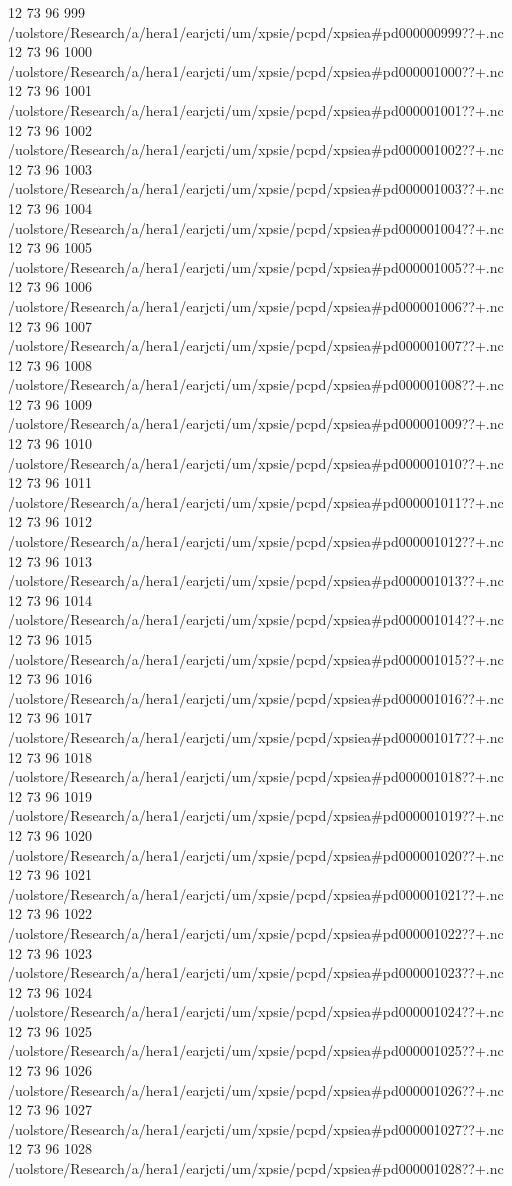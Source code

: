 12 73 96
999
/uolstore/Research/a/hera1/earjcti/um/xpsie/pcpd/xpsiea#pd000000999??+.nc
12 73 96
1000
/uolstore/Research/a/hera1/earjcti/um/xpsie/pcpd/xpsiea#pd000001000??+.nc
12 73 96
1001
/uolstore/Research/a/hera1/earjcti/um/xpsie/pcpd/xpsiea#pd000001001??+.nc
12 73 96
1002
/uolstore/Research/a/hera1/earjcti/um/xpsie/pcpd/xpsiea#pd000001002??+.nc
12 73 96
1003
/uolstore/Research/a/hera1/earjcti/um/xpsie/pcpd/xpsiea#pd000001003??+.nc
12 73 96
1004
/uolstore/Research/a/hera1/earjcti/um/xpsie/pcpd/xpsiea#pd000001004??+.nc
12 73 96
1005
/uolstore/Research/a/hera1/earjcti/um/xpsie/pcpd/xpsiea#pd000001005??+.nc
12 73 96
1006
/uolstore/Research/a/hera1/earjcti/um/xpsie/pcpd/xpsiea#pd000001006??+.nc
12 73 96
1007
/uolstore/Research/a/hera1/earjcti/um/xpsie/pcpd/xpsiea#pd000001007??+.nc
12 73 96
1008
/uolstore/Research/a/hera1/earjcti/um/xpsie/pcpd/xpsiea#pd000001008??+.nc
12 73 96
1009
/uolstore/Research/a/hera1/earjcti/um/xpsie/pcpd/xpsiea#pd000001009??+.nc
12 73 96
1010
/uolstore/Research/a/hera1/earjcti/um/xpsie/pcpd/xpsiea#pd000001010??+.nc
12 73 96
1011
/uolstore/Research/a/hera1/earjcti/um/xpsie/pcpd/xpsiea#pd000001011??+.nc
12 73 96
1012
/uolstore/Research/a/hera1/earjcti/um/xpsie/pcpd/xpsiea#pd000001012??+.nc
12 73 96
1013
/uolstore/Research/a/hera1/earjcti/um/xpsie/pcpd/xpsiea#pd000001013??+.nc
12 73 96
1014
/uolstore/Research/a/hera1/earjcti/um/xpsie/pcpd/xpsiea#pd000001014??+.nc
12 73 96
1015
/uolstore/Research/a/hera1/earjcti/um/xpsie/pcpd/xpsiea#pd000001015??+.nc
12 73 96
1016
/uolstore/Research/a/hera1/earjcti/um/xpsie/pcpd/xpsiea#pd000001016??+.nc
12 73 96
1017
/uolstore/Research/a/hera1/earjcti/um/xpsie/pcpd/xpsiea#pd000001017??+.nc
12 73 96
1018
/uolstore/Research/a/hera1/earjcti/um/xpsie/pcpd/xpsiea#pd000001018??+.nc
12 73 96
1019
/uolstore/Research/a/hera1/earjcti/um/xpsie/pcpd/xpsiea#pd000001019??+.nc
12 73 96
1020
/uolstore/Research/a/hera1/earjcti/um/xpsie/pcpd/xpsiea#pd000001020??+.nc
12 73 96
1021
/uolstore/Research/a/hera1/earjcti/um/xpsie/pcpd/xpsiea#pd000001021??+.nc
12 73 96
1022
/uolstore/Research/a/hera1/earjcti/um/xpsie/pcpd/xpsiea#pd000001022??+.nc
12 73 96
1023
/uolstore/Research/a/hera1/earjcti/um/xpsie/pcpd/xpsiea#pd000001023??+.nc
12 73 96
1024
/uolstore/Research/a/hera1/earjcti/um/xpsie/pcpd/xpsiea#pd000001024??+.nc
12 73 96
1025
/uolstore/Research/a/hera1/earjcti/um/xpsie/pcpd/xpsiea#pd000001025??+.nc
12 73 96
1026
/uolstore/Research/a/hera1/earjcti/um/xpsie/pcpd/xpsiea#pd000001026??+.nc
12 73 96
1027
/uolstore/Research/a/hera1/earjcti/um/xpsie/pcpd/xpsiea#pd000001027??+.nc
12 73 96
1028
/uolstore/Research/a/hera1/earjcti/um/xpsie/pcpd/xpsiea#pd000001028??+.nc
